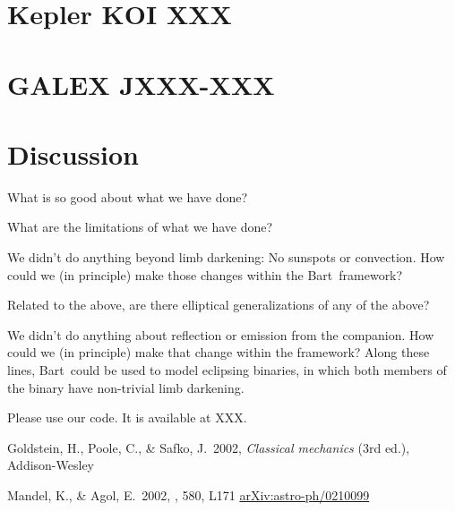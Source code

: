 \documentclass[12pt,preprint]{aastex}
\newcommand{\project}[1]{{\sffamily #1}}
\newcommand{\bart}{\project{Bart}}
\begin{document}
\section{Kepler KOI XXX}

\section{GALEX JXXX-XXX}

\section{Discussion}

What is so good about what we have done?

What are the limitations of what we have done?

We didn't do anything beyond limb darkening:  No sunspots or convection.
How could we (in principle) make those changes within the \bart\ framework?

Related to the above, are there elliptical generalizations of any of the above?

We didn't do anything about reflection or emission from the companion.
How could we (in principle) make that change within the framework?
Along these lines, \bart\ could be used to model eclipsing binaries,
in which both members of the binary have non-trivial limb darkening.

Please use our code.  It is available at XXX.

\acknowledgments


\newcommand{\arxiv}[1]{\href{http://arxiv.org/abs/#1}{arXiv:#1}}
\begin{thebibliography}{}\raggedright

    Goldstein, H., Poole, C., \& Safko, J.\ 2002, \emph{Classical mechanics}
    (3rd ed.), Addison-Wesley

        Mandel, K., \& Agol, E.\ 2002, \apjl, 580, L171
        \arxiv{astro-ph/0210099}

\end{thebibliography}


\clearpage
\end{document}
